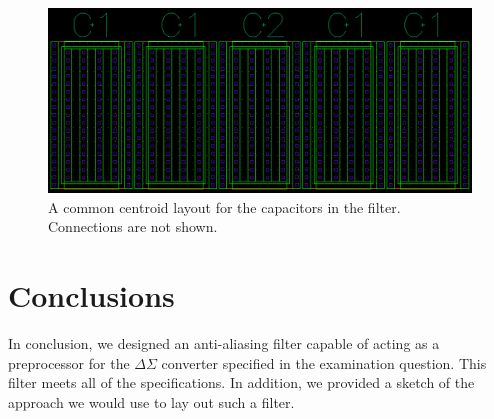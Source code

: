 \documentclass[journal,hidelinks]{IEEEtran}
\begin{document}
\begin{figure}[!htb]
  \centering
  \includegraphics[width=\columnwidth]{layout/cap.png}
  \caption{A common centroid layout for the capacitors in the filter. Connections are not shown.}
  \label{fig:layout_cap}
\end{figure}

\section{Conclusions}

In conclusion, we designed an anti-aliasing filter capable of acting as a preprocessor for the $\Delta \Sigma$ converter specified in the examination question. This filter meets all of the specifications. In addition, we provided a sketch of the approach we would use to lay out such a filter.



\end{document}
